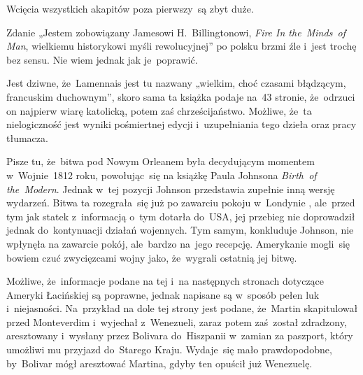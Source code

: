 \documentclass[a4paper,11pt]{article}
\begin{document}
\vspace{0em}



\vspace{0em}


\noindent
{} Wcięcia wszystkich akapitów poza pierwszy~są zbyt duże.

\vspace{\spaceFour}





\noindent
{} Zdanie „Jestem zobowiązany Jamesowi H.~Billingtonowi,
\textit{Fire In the~Minds~of Man}, wielkiemu historykowi myśli
rewolucyjnej” po polsku brzmi źle i~jest trochę bez sensu. Nie wiem jednak
jak je~poprawić.

\vspace{\spaceFour}





\noindent
{} Jest dziwne, że~Lamennais jest tu nazwany „wielkim, choć czasami
błądzącym, francuskim duchownym”, skoro sama ta książka podaje na~43
stronie, że~odrzuci on najpierw wiarę katolicką, potem zaś chrześcijaństwo.
Możliwe, że~ta nielogiczność jest wyniki pośmiertnej edycji i~uzupełniania
tego dzieła oraz pracy tłumacza.

\vspace{\spaceFour}





\noindent
{} Pisze tu, że~bitwa pod Nowym Orleanem była decydującym momentem
w~Wojnie~1812 roku, powołując~się na książkę Paula Johnsona
\textit{Birth~of the~Modern}. Jednak w~tej pozycji Johnson przedstawia
zupełnie inną wersję wydarzeń. Bitwa ta rozegrała~się już po zawarciu
pokoju w~Londynie , ale~przed tym jak statek
z~informacją o~tym dotarła do~USA, jej przebieg nie doprowadził jednak
do~kontynuacji działań wojennych. Tym samym, konkluduje Johnson, nie
wpłynęła na zawarcie pokój, ale~bardzo na~jego recepcję. Amerykanie
mogli~się bowiem czuć zwycięzcami wojny jako, że~wygrali ostatnią jej
bitwę.

\vspace{\spaceFour}





\noindent
{} Możliwe, że~informacje podane na tej i~na następnych stronach
dotyczące Ameryki Łacińskiej są poprawne, jednak napisane są w~sposób pełen
luk i~niejasności. Na~przykład na dole tej strony jest podane, że~Martin
skapitulował przed Monteverdim i~wyjechał z~Wenezueli, zaraz potem
zaś~został zdradzony, aresztowany i~wysłany przez Bolivara do~Hiszpanii
w~zamian za paszport, który umożliwi mu przyjazd do~Starego Kraju.
Wydaje~się mało prawdopodobne, by~Bolivar mógł aresztować Martina, gdyby
ten opuścił już Wenezuelę.
\end{document}

